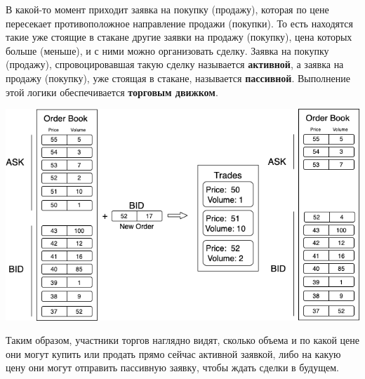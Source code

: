 \newpage

В какой-то момент приходит заявка на покупку (продажу), которая по цене пересекает противоположное направление продажи (покупки). То есть находятся такие уже стоящие в стакане другие заявки на продажу (покупку), цена которых больше (меньше), и с ними можно организовать сделку. Заявка на покупку (продажу), спровоцировавшая такую сделку называется \textbf{активной}, а заявка на продажу (покупку), уже стоящая в стакане, называется \textbf{пассивной}. Выполнение этой логики обеспечивается \textbf{торговым движком}.


\begin{center}
\includegraphics[width=450pt]{images/trade_schema.png}
\end{center}

Таким образом, участники торгов наглядно видят, сколько объема и по какой цене они могут купить или продать прямо сейчас активной заявкой, либо на какую цену они могут отправить пассивную заявку, чтобы ждать сделки в будущем.

\pagebreak
